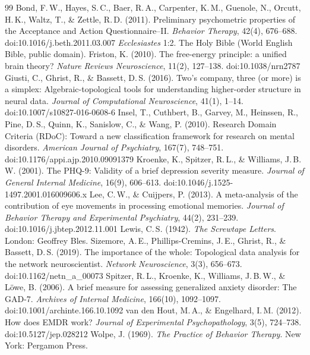 \documentclass[11pt]{article}
\begin{document}
\begin{thebibliography}{99}\small
{} Bond, F.\,W., Hayes, S.\,C., Baer, R.\,A., Carpenter, K.\,M., Guenole, N., Orcutt, H.\,K., Waltz, T., \& Zettle, R.\,D. (2011). Preliminary psychometric properties of the Acceptance and Action Questionnaire--II. \emph{Behavior Therapy}, 42(4), 676--688. doi:10.1016/j.beth.2011.03.007
 \emph{Ecclesiastes} 1:2. The Holy Bible (World English Bible, public domain).
 Friston, K. (2010). The free-energy principle: a unified brain theory? \emph{Nature Reviews Neuroscience}, 11(2), 127--138. doi:10.1038/nrn2787
 Giusti, C., Ghrist, R., \& Bassett, D.\,S. (2016). Two's company, three (or more) is a simplex: Algebraic-topological tools for understanding higher-order structure in neural data. \emph{Journal of Computational Neuroscience}, 41(1), 1--14. doi:10.1007/s10827-016-0608-6
 Insel, T., Cuthbert, B., Garvey, M., Heinssen, R., Pine, D.\,S., Quinn, K., Sanislow, C., \& Wang, P. (2010). Research Domain Criteria (RDoC): Toward a new classification framework for research on mental disorders. \emph{American Journal of Psychiatry}, 167(7), 748--751. doi:10.1176/appi.ajp.2010.09091379
 Kroenke, K., Spitzer, R.\,L., \& Williams, J.\,B.\,W. (2001). The PHQ-9: Validity of a brief depression severity measure. \emph{Journal of General Internal Medicine}, 16(9), 606--613. doi:10.1046/j.1525-1497.2001.016009606.x
 Lee, C.\,W., \& Cuijpers, P. (2013). A meta-analysis of the contribution of eye movements in processing emotional memories. \emph{Journal of Behavior Therapy and Experimental Psychiatry}, 44(2), 231--239. doi:10.1016/j.jbtep.2012.11.001
 Lewis, C.\,S. (1942). \emph{The Screwtape Letters}. London: Geoffrey Bles.
 Sizemore, A.\,E., Phillips-Cremins, J.\,E., Ghrist, R., \& Bassett, D.\,S. (2019). The importance of the whole: Topological data analysis for the network neuroscientist. \emph{Network Neuroscience}, 3(3), 656--673. doi:10.1162/netn\_a\_00073
 Spitzer, R.\,L., Kroenke, K., Williams, J.\,B.\,W., \& L\"owe, B. (2006). A brief measure for assessing generalized anxiety disorder: The GAD-7. \emph{Archives of Internal Medicine}, 166(10), 1092--1097. doi:10.1001/archinte.166.10.1092
 van den Hout, M.\,A., \& Engelhard, I.\,M. (2012). How does EMDR work? \emph{Journal of Experimental Psychopathology}, 3(5), 724--738. doi:10.5127/jep.028212
 Wolpe, J. (1969). \emph{The Practice of Behavior Therapy}. New York: Pergamon Press.

\end{thebibliography}
\end{document}
